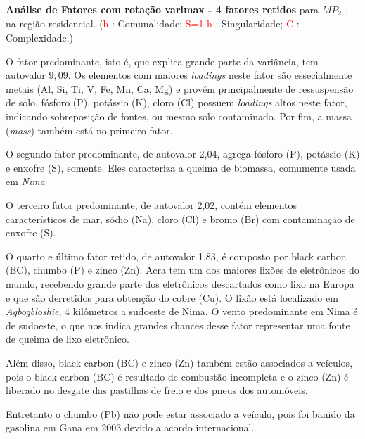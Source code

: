 \begin{table}[H]
  \caption{\textbf{Análise de Fatores com rotação varimax - 4 fatores retidos} 
             para $MP_{2,5}$ na região residencial.
           (\textcolor{red}{h} : Comunalidade; 
           \textcolor{red}{S=1-h} : Singularidade; 
           \textcolor{red}{C} : Complexidade.)}
  
\end{table}

O fator predominante, isto é, que explica grande parte da variância, 
tem autovalor $9,09$.
Os elementos com maiores \textit{loadings} neste fator são essecialmente 
metais (Al, Si, Ti, V, Fe, Mn, Ca, Mg) e provém principalmente de ressuspensão de solo.
fósforo (P), potássio (K), cloro (Cl) possuem \textit{loadings} 
altos neste fator, indicando sobreposição de fontes, ou mesmo solo contaminado.
Por fim, a massa (\textit{mass}) também está no primeiro fator.

O segundo fator predominante, de autovalor 2,04, agrega fósforo (P), 
potássio (K) e enxofre (S), somente. Eles caracteriza a queima de biomassa, 
comumente usada em \textit{Nima} 

O terceiro fator predominante, de autovalor 2,02, contém elementos
característicos de mar, sódio (Na), cloro (Cl) e bromo (Br) com 
contaminação de enxofre (S). 

O quarto e último fator retido, de autovalor 1,83, é composto 
por black carbon (BC), chumbo (P) e zinco (Zn). 
Acra tem um dos maiores lixões de eletrônicos do mundo, recebendo
grande parte dos eletrônicos descartados como lixo na Europa e que são derretidos
para obtenção do cobre (Cu). O lixão está localizado em \textit{Agbogbloshie}, 
4 kilômetros a sudoeste de Nima. O vento predominante em Nima é de sudoeste, 
o que nos indica grandes chances desse fator representar uma fonte de queima de 
lixo eletrônico.

Além disso, black carbon (BC) e zinco (Zn) também estão associados a veículos, 
pois o black carbon (BC) é resultado de combustão incompleta e o zinco (Zn) é
liberado no desgate das pastilhas de freio e dos pneus dos automóveis. 

Entretanto o chumbo (Pb) não pode estar associado a veículo, pois 
foi banido da gasolina em Gana em 2003 devido a acordo internacional.

